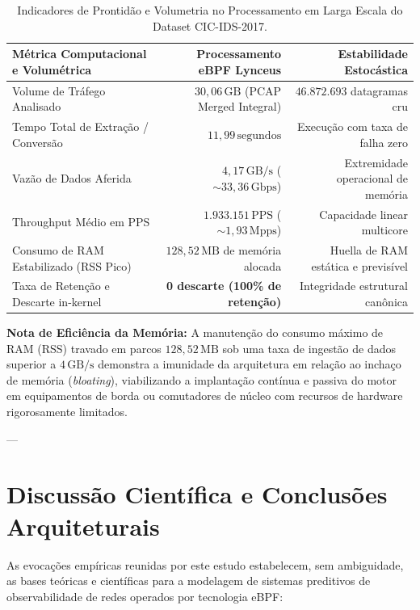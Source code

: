 \documentclass[11pt,a4paper]{article}
\begin{document}
\begin{table}[H]
\centering
\begin{threeparttable}
\begin{tabular}{lrr}
\toprule
\textbf{Métrica Computacional e Volumétrica} & \textbf{Processamento eBPF Lynceus} & \textbf{Estabilidade Estocástica} \\
\midrule
Volume de Tráfego Analisado & $30,06\,\text{GB}$ (PCAP Merged Integral) & $46.872.693$ datagramas cru \\
Tempo Total de Extração / Conversão & $11,99\,\text{segundos}$ & Execução com taxa de falha zero \\
Vazão de Dados Aferida & $4,17\,\text{GB/s}$ ($\sim 33,36\,\text{Gbps}$) & Extremidade operacional de memória \\
Throughput Médio em PPS & $1.933.151\,\text{PPS}$ ($\sim 1,93\,\text{Mpps}$) & Capacidade linear multicore \\
Consumo de RAM Estabilizado (RSS Pico) & $128,52\,\text{MB}$ de memória alocada & Huella de RAM estática e previsível \\
Taxa de Retenção e Descarte in-kernel & \textbf{0 descarte (100\% de retenção)} & Integridade estrutural canônica \\
\bottomrule
\end{tabular}
\begin{tablenotes}
\small
\item[-] \textbf{Nota de Eficiência da Memória:} A manutenção do consumo máximo de RAM (RSS) travado em parcos $128,52\,\text{MB}$ sob uma taxa de ingestão de dados superior a $4\,\text{GB/s}$ demonstra a imunidade da arquitetura em relação ao inchaço de memória (\textit{bloating}), viabilizando a implantação contínua e passiva do motor em equipamentos de borda ou comutadores de núcleo com recursos de hardware rigorosamente limitados.
\end{tablenotes}
\end{threeparttable}
\caption{Indicadores de Prontidão e Volumetria no Processamento em Larga Escala do Dataset CIC-IDS-2017.}
\end{table}

---

\section{Discussão Científica e Conclusões Arquiteturais}
As evocações empíricas reunidas por este estudo estabelecem, sem ambiguidade, as bases teóricas e científicas para a modelagem de sistemas preditivos de observabilidade de redes operados por tecnologia eBPF:
\end{document}
